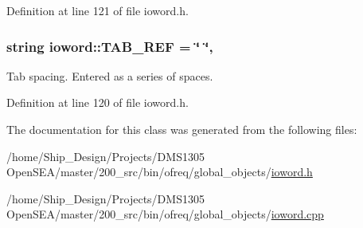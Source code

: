 Definition at line 121 of file ioword.\-h.

\hypertarget{classosea_1_1ofreq_1_1ioword_a62db7db62399bfac9af746ac589801b2}{
\subsubsection[{T\-A\-B\-\_\-\-R\-E\-F}]{\setlength{\rightskip}{0pt plus 5cm}string ioword\-::\-T\-A\-B\-\_\-\-R\-E\-F = \char`\"{} \char`\"{}\hspace{0.3cm}{\ttfamily [static]}, {\ttfamily [protected]}}}\label{classosea_1_1ofreq_1_1ioword_a62db7db62399bfac9af746ac589801b2}
Tab spacing. Entered as a series of spaces. 

Definition at line 120 of file ioword.\-h.



The documentation for this class was generated from the following files\-:\begin{DoxyCompactItemize}
\item 
/home/\-Ship\-\_\-\-Design/\-Projects/\-D\-M\-S1305 Open\-S\-E\-A/master/200\-\_\-src/bin/ofreq/global\-\_\-objects/\hyperlink{ioword_8h}{ioword.\-h}\item 
/home/\-Ship\-\_\-\-Design/\-Projects/\-D\-M\-S1305 Open\-S\-E\-A/master/200\-\_\-src/bin/ofreq/global\-\_\-objects/\hyperlink{ioword_8cpp}{ioword.\-cpp}\end{DoxyCompactItemize}
